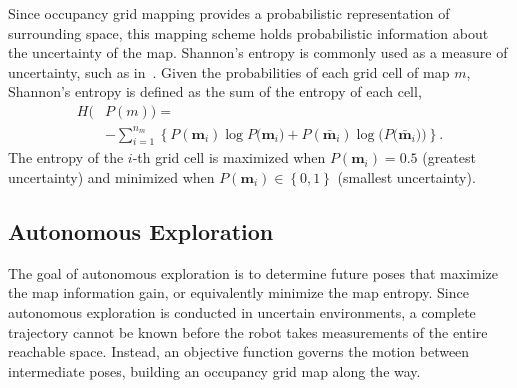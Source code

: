 \documentclass[letterpaper, 10pt, conference]{ieeeconf}
\newcommand{\braces}[1]{\ensuremath{\left\{ #1 \right\}}}
\begin{document}
Since occupancy grid mapping provides a probabilistic representation of surrounding space, this mapping scheme holds probabilistic information about the uncertainty of the map. Shannon's entropy is commonly used as a measure of uncertainty, such as in~\cite{CarDamKumCas15,StaGriBur05}. Given the probabilities of each grid cell of map $m$, Shannon's entropy is defined as the sum of the entropy of each cell,
\begin{align}
\label{eqn:ShannonsEntropyDef}
H(&P(m))=\nonumber\\&-\sum_{i=1}^{n_m}\braces{
P(\mathbf{m}_i)\log{P(\mathbf{m}_i})+P(\bar{\mathbf{m}}_i)\log{(P(\bar{\mathbf{m}}_i}))}.
\end{align}
The entropy of the $i$-th grid cell is maximized when $P(\mathbf{m}_i)=0.5$ (greatest uncertainty) and minimized when $P(\mathbf{m}_i)\in\braces{0,1}$ (smallest uncertainty). %


\subsection{Autonomous Exploration}

The goal of autonomous exploration is to determine future poses that maximize the map information gain, or equivalently minimize the map entropy. 
Since autonomous exploration is conducted in uncertain environments, a complete trajectory cannot be known before the robot takes measurements of the entire reachable space.
Instead, an objective function governs the motion between intermediate poses, building an occupancy grid map along the way.
\end{document}
